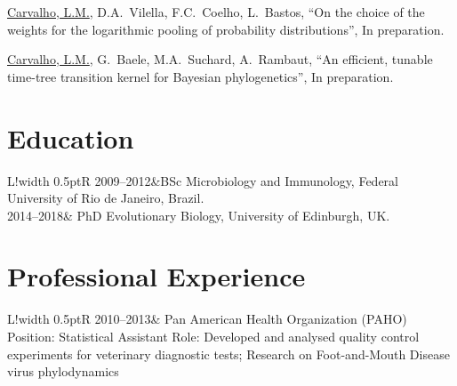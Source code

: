 \documentclass[10pt]{article}
\newcommand\VRule{\color{lightgray}\vrule width 0.5pt}
\begin{document}
\underline{Carvalho, L.M.}, D.A.~Vilella, F.C.~Coelho, L.~Bastos, ``{O}n the choice of the weights for the logarithmic pooling of probability distributions'', In preparation.

\underline{Carvalho, L.M.}, G.~Baele, M.A.~Suchard, A.~Rambaut, ``{A}n efficient, tunable time-tree transition kernel for Bayesian phylogenetics'', In preparation.

\newpage
\section*{Education}
\begin{tabular}{L!{\VRule}R}
2009--2012&BSc Microbiology and Immunology, Federal University of Rio de Janeiro, Brazil.\\
2014--2018& PhD Evolutionary Biology, University of Edinburgh, UK.
\end{tabular}

\section*{Professional Experience}
\begin{tabular}{L!{\VRule}R}
2010--2013&{
Pan American Health Organization (PAHO)\newline
Position: Statistical Assistant\newline
Role: Developed and analysed quality control experiments for veterinary diagnostic tests;\newline
Research on Foot-and-Mouth Disease virus phylodynamics 
}
\end{tabular}
\end{document}
